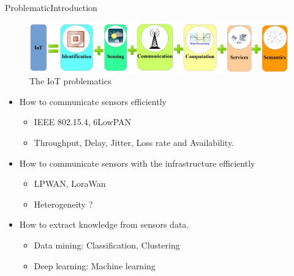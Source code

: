 \begin{frame}{Problematic}{Introduction}

\begin{figure}
	\includegraphics[width=.7\columnwidth]{res/iotChallenges.png}
	\caption{\label{fig:iotChallenges}The IoT problematics}
\end{figure}

\begin{itemize}
	\item How to communicate sensors efficiently
		\begin{itemize}
			\item IEEE 802.15.4, 6LowPAN
			\item Throughput, Delay, Jitter, Loss rate and Availability.
		\end{itemize}
	\item How to communicate sensors with the infrastructure efficiently
		\begin{itemize}
			\item LPWAN, LoraWan
			\item Heterogeneity ?
		\end{itemize}
	\item How to extract knowledge from sensors data.
		\begin{itemize}
			\item Data mining: Classification, Clustering
			\item Deep learning: Machine learning
		\end{itemize}
\end{itemize}
	
\end{frame}

